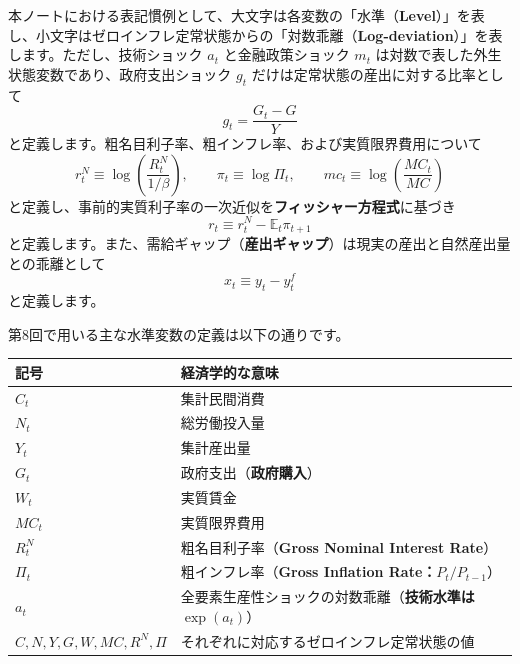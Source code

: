 \documentclass[
  japanese,
  lualatex,
  ja=standard,
  12pt,
  a4paper]{ltjsarticle}
\newcounter{none} %
\begin{document}
本ノートにおける表記慣例として、大文字は各変数の「水準（\textbf{Level}）」を表し、小文字はゼロインフレ定常状態からの「対数乖離（\textbf{Log-deviation}）」を表します。ただし、技術ショック
\(a_t\) と金融政策ショック \(m_t\)
は対数で表した外生状態変数であり、政府支出ショック \(g_t\)
だけは定常状態の産出に対する比率として \[
g_t=\frac{G_t-G}{Y}
\] と定義します。粗名目利子率、粗インフレ率、および実質限界費用について
\[
r_t^N\equiv\log\left(\frac{R_t^N}{1/\beta}\right),
\qquad
\pi_t\equiv\log\Pi_t,
\qquad
mc_t\equiv\log\left(\frac{MC_t}{MC}\right)
\]
と定義し、事前的実質利子率の一次近似を\textbf{フィッシャー方程式}に基づき
\[
r_t\equiv r_t^N-\mathbb{E}_t\pi_{t+1}
\]
と定義します。また、需給ギャップ（\textbf{産出ギャップ}）は現実の産出と自然産出量との乖離として
\[
x_t\equiv y_t-y_t^f
\] と定義します。

第8回で用いる主な水準変数の定義は以下の通りです。

{\def\LTcaptype{none} %
\begin{longtable}[]{@{}
  >{\raggedright\arraybackslash}p{}
  >{\raggedright\arraybackslash}p{}@{}}
\toprule\noalign{}
\begin{minipage}[b]{\linewidth}\raggedright
記号
\end{minipage} & \begin{minipage}[b]{\linewidth}\raggedright
経済学的な意味
\end{minipage} \\
\midrule\noalign{}
\endhead
\bottomrule\noalign{}
\endlastfoot
\(C_t\) & 集計民間消費 \\
\(N_t\) & 総労働投入量 \\
\(Y_t\) & 集計産出量 \\
\(G_t\) & 政府支出（\textbf{政府購入}） \\
\(W_t\) & 実質賃金 \\
\(MC_t\) & 実質限界費用 \\
\(R_t^N\) & 粗名目利子率（\textbf{Gross Nominal Interest Rate}） \\
\(\Pi_t\) & 粗インフレ率（\textbf{Gross Inflation
Rate：\(P_t/P_{t-1}\)}） \\
\(a_t\) & 全要素生産性ショックの対数乖離（\textbf{技術水準は
\(\exp(a_t)\)}） \\
\(C, N, Y, G, W, MC, R^N, \Pi\) &
それぞれに対応するゼロインフレ定常状態の値 \\
\end{longtable}
}
\end{document}
